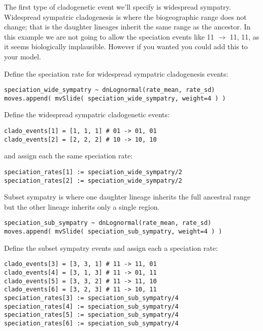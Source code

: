 The first type of cladogenetic event we'll specify is widespread sympatry.
Widespread sympatric cladogenesis is where the biogeographic range does
not change; that is the daughter lineages inherit the same range as
the ancestor. In this example we are not going to allow the speciation events like
11 $\rightarrow$ 11, 11, as it seems biologically implausible. However if you wanted 
you could add this to your model.

Define the speciation rate for widespread sympatric cladogenesis events:
{\tt \begin{snugshade*}
\begin{lstlisting}
speciation_wide_sympatry ~ dnLognormal(rate_mean, rate_sd)
moves.append( mvSlide( speciation_wide_sympatry, weight=4 ) )
\end{lstlisting}
\end{snugshade*}}

Define the widespread sympatric cladogenetic events:
{\tt \begin{snugshade*}
\begin{lstlisting}
clado_events[1] = [1, 1, 1] # 01 -> 01, 01
clado_events[2] = [2, 2, 2] # 10 -> 10, 10
\end{lstlisting}
\end{snugshade*}}

and assign each the same speciation rate:
{\tt \begin{snugshade*}
\begin{lstlisting}
speciation_rates[1] := speciation_wide_sympatry/2
speciation_rates[2] := speciation_wide_sympatry/2
\end{lstlisting}
\end{snugshade*}}

Subset sympatry is where one daughter lineage inherits the full
ancestral range but the other lineage inherits only a single region.
{\tt \begin{snugshade*}
\begin{lstlisting}
speciation_sub_sympatry ~ dnLognormal(rate_mean, rate_sd)
moves.append( mvSlide( speciation_sub_sympatry, weight=4 ) )
\end{lstlisting}
\end{snugshade*}}

Define the subset sympatry events and assign each a speciation rate:
{\tt \begin{snugshade*}
\begin{lstlisting}
clado_events[3] = [3, 3, 1] # 11 -> 11, 01 
clado_events[4] = [3, 1, 3] # 11 -> 01, 11
clado_events[5] = [3, 3, 2] # 11 -> 11, 10
clado_events[6] = [3, 2, 3] # 11 -> 10, 11
speciation_rates[3] := speciation_sub_sympatry/4
speciation_rates[4] := speciation_sub_sympatry/4
speciation_rates[5] := speciation_sub_sympatry/4
speciation_rates[6] := speciation_sub_sympatry/4
\end{lstlisting}
\end{snugshade*}}

